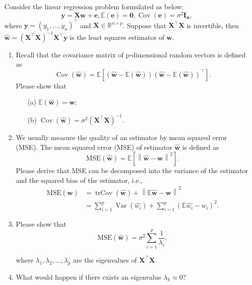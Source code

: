\documentclass[11pt,letter,notitlepage]{article}
\theoremstyle{definition}
\begin{document}
\newpage
\begin{exercise}[Multicollinearity]
	Consider the linear regression problem formulated as below:
	$$\mathbf{y} = \mathbf{X} \mathbf{ w + e}, \mathbb{E}(\mathbf{e}) = \mathbf{0}, \operatorname{Cov}(\mathbf{e}) = \sigma^2 \mathbf{I_n}, $$where $\mathbf{y}=\left(y_{1}, \ldots, y_{n}\right)^{\top}$ and $\mathbf{X} \in \mathbb{R}^{n \times p}$. Suppose that $\mathbf{X}^{\top}\mathbf{X}$ is invertible, then $\hat{\mathbf{w}} = \left(\mathbf{X}^{\top} \mathbf{X}\right)^{-1} \mathbf{X}^{\top} \mathbf{y}$ is the least squares estimator of $\mathbf{w}$.
	\begin{enumerate}
		\item Recall that the covariance matrix of p-dimensional random vectors is defined as $$\operatorname{Cov}(\hat{\mathbf{w}}) = \mathbb{E}\mathbf{[(\hat{\mathbf{w}}-\mathbb{E}(\hat{\mathbf{w}}))(\hat{\mathbf{w}}-\mathbb{E}(\hat{\mathbf{w}}))^{\top}]}.$$
		Please show that
		\begin{enumerate}
			\item[(a)] $\mathbb{E}(\hat{\mathbf{w}}) = \mathbf{w}$;
			\item[(b)] $\operatorname{Cov}(\hat{\mathbf{w}}) = \sigma^2 \left(\mathbf{X}^{\top} \mathbf{X}\right)^{-1}$.
		\end{enumerate}
		\item We usually measure the quality of an estimator by mean squared error (MSE). The mean squared error (MSE) of estimator $\hat{\mathbf{w}}$ is defined as 	$$\text{MSE}(\hat{\mathbf{w}}) = \mathbb{E}[\left\|\hat{\mathbf{w}} - \mathbf{w}\right
		\|^2] .$$ Please derive that MSE can be decomposed into the variance of the estimator and the squared bias of the estimator, i.e.,
			$$\begin{aligned}
			\text{MSE}(\hat{\mathbf{w}}) &= \operatorname{trCov}(\hat{\mathbf{w}}) + \left\|\mathbb{E}\hat{\mathbf{w}}-\mathbf{w}\right\|^2\\
			&=\sum_{i=1}^{p} \operatorname{Var}(\hat{w_i}) + \sum_{i=1}^{p}  (\mathbb{E} \hat{w_i}-w_i)^2.
		\end{aligned}$$ 
		\item Please show that
		$$\text{MSE}(\hat{\mathbf{w}}) = \sigma^2 \sum_{i=1}^{p} \frac{1}{\lambda_i},$$ 
		
		where $\lambda_1,\lambda_2,\ldots,\lambda_{p}$ are the eigenvalues of $\mathbf{X}^{\top} \mathbf{X}$.
		\item What would happen if there exists an eigenvalue $\lambda_k \approx 0$?
	\end{enumerate}
\end{exercise}
	\begin{solution}
		
	\end{solution}
\end{document}
